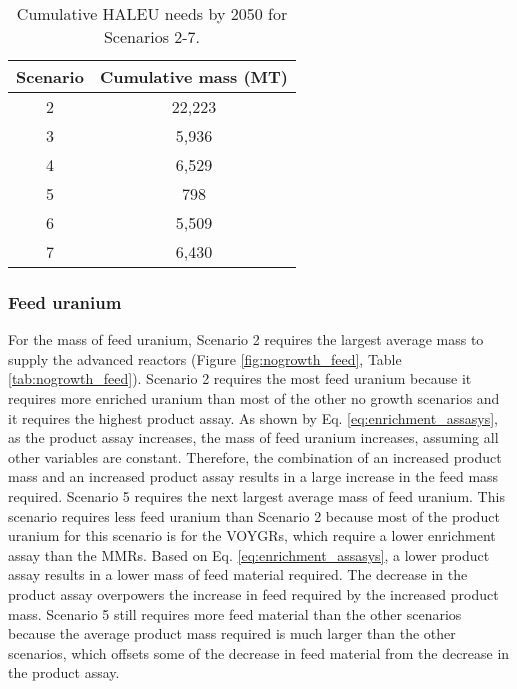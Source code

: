 \begin{table}[h!]
    \centering 
    \caption{Cumulative HALEU needs by 2050 for Scenarios 2-7.}
    \label{tab:nogrowth_haleu}
    \begin{tabular}{c c}
        \hline 
        Scenario & Cumulative mass (MT) \\
        \hline
        2 & 22,223\\
        3 & 5,936 \\
        4 & 6,529 \\
        5 & 798 \\
        6 & 5,509 \\
        7 & 6,430 \\
        \hline        
    \end{tabular}
\end{table}

\subsubsection{Feed uranium}
For the mass of feed uranium, Scenario 2 requires the largest average mass 
to supply the advanced reactors (Figure \ref{fig:nogrowth_feed}, Table 
\ref{tab:nogrowth_feed}). Scenario 2 requires the most feed uranium 
because it requires more enriched uranium than most 
of the other no growth scenarios and it requires the highest product 
assay. As shown by Eq. \ref{eq:enrichment_assasys}, as the product assay 
increases, the mass of feed uranium increases, assuming all other 
variables are constant. Therefore, the combination of an increased product 
mass and an increased product assay results in a large increase in the feed 
mass required. Scenario 5 requires the next largest average 
mass of feed uranium. This scenario requires less feed uranium than Scenario 2 
because 
most of the product uranium for this scenario is for the VOYGRs, which 
require a lower enrichment assay than the \glspl{MMR}. Based on Eq. 
\ref{eq:enrichment_assasys}, a lower product assay results in 
a lower mass of feed material required. The decrease in the product 
assay overpowers the increase in feed required by the increased product mass. 
Scenario 5 still requires more feed 
material than the other scenarios because the average product mass required 
is much larger than the other scenarios, which offsets some of the decrease 
in feed material from the decrease in the product assay. 

